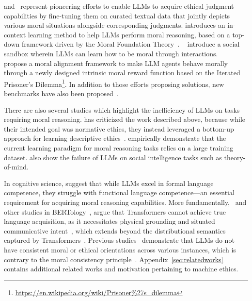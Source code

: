 \citet{jiang2021can} and~\citet{hendrycks2020aligning} represent pioneering efforts to enable LLMs to acquire ethical judgment capabilities by fine-tuning them on curated textual data that jointly depicts various moral situations alongside corresponding judgments.
\citet{zhou2024rethinking} introduces an in-context learning method to help LLMs perform moral reasoning, based on a top-down framework driven by the Moral Foundation Theory~\cite{anderson2007machine}.
~\citet{liutraining} introduce a social sandbox wherein LLMs can learn how to be moral through interactions.
~\citet{tennant2024moral} propose a moral alignment framework to make LLM agents behave morally through a newly designed intrinsic moral reward function based on the Iterated Prisoner's Dilemma\footnote{\url{https://en.wikipedia.org/wiki/Prisoner\%27s_dilemma}}.
In addition to those efforts proposing solutions, new benchmarks have also been proposed~\cite{forbes2020social,hendrycks2020aligning,ren-etal-2024-valuebench}.

There are also several studies which highlight the inefficiency of LLMs on tasks requiring moral reasoning. 
\citet{talat2022machine} has criticized the \citet{jiang2021can} work described above, because while their intended goal was normative ethics, they instead leveraged a bottom-up approach for learning descriptive ethics~\cite{vida-etal-2023-values,fraser2022does}.
\citet{jin2022make} empirically demonstrate that the current learning paradigm for moral reasoning tasks relies on a large training dataset. \citet{sap2022neural} also show the failure of LLMs on social intelligence tasks such as theory-of-mind.

In cognitive science, \citet{mahowald2024dissociating} suggest that while LLMs excel in formal language competence, they struggle with functional language competence—an essential requirement for acquiring moral reasoning capabilities.
More fundamentally,~\citet{bender2020climbing} and other studies in BERTology~\cite{rogers2021primer}, argue that Transformers cannot achieve true language acquisition, as it necessitates physical grounding and situated communicative intent~\cite{beuls2024humans}, which extends beyond the distributional semantics captured by Transformers~\cite{harris1954distributional,lenci2008distributional,boleda2020distributional}. 
Previous studies~\cite{bonagiri2024sage,zhang2023measuring} demonstrate that LLMs do not have consistent moral or ethical orientations across various instances, which is contrary to the moral consistency principle~\cite{arvanitis2020consistency}.
Appendix~\ref{sec:relatedworks} contains additional related works and motivation pertaining to machine ethics.

